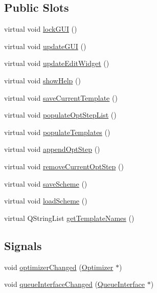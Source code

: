 \subsection*{Public Slots}
\begin{DoxyCompactItemize}
\item 
virtual void \hyperlink{classGlobalSearch_1_1AbstractEditTab_a450c63567ac48b329469b2c380ff46a4}{lock\+G\+U\+I} ()
\item 
virtual void \hyperlink{classGlobalSearch_1_1AbstractEditTab_ae34c4af22aa9a04eebc3a4a4a284da53}{update\+G\+U\+I} ()
\item 
virtual void \hyperlink{classGlobalSearch_1_1AbstractEditTab_a19292ce55de31e989deee2b166c188d1}{update\+Edit\+Widget} ()
\item 
virtual void \hyperlink{classGlobalSearch_1_1AbstractEditTab_a19d5d4e568a67e46cc6431ba8c4199d0}{show\+Help} ()
\item 
virtual void \hyperlink{classGlobalSearch_1_1AbstractEditTab_a27965a0c57832b480b6663e786950e7d}{save\+Current\+Template} ()
\item 
virtual void \hyperlink{classGlobalSearch_1_1AbstractEditTab_ac973d18ed4a3c2d4ed8392a1fc8bed10}{populate\+Opt\+Step\+List} ()
\item 
virtual void \hyperlink{classGlobalSearch_1_1AbstractEditTab_ae37c49f896c0d668d48ef9bcae90dcf7}{populate\+Templates} ()
\item 
virtual void \hyperlink{classGlobalSearch_1_1AbstractEditTab_ae86997d35f9d05458638766b4378b92d}{append\+Opt\+Step} ()
\item 
virtual void \hyperlink{classGlobalSearch_1_1AbstractEditTab_a5507b5aaa5021085a57d1be72b71d975}{remove\+Current\+Opt\+Step} ()
\item 
virtual void \hyperlink{classGlobalSearch_1_1AbstractEditTab_a5ff01d9316ca927b7cf75d7a6720a793}{save\+Scheme} ()
\item 
virtual void \hyperlink{classGlobalSearch_1_1AbstractEditTab_a0b0d6a412e3b73113a0e84f6a86c0a8c}{load\+Scheme} ()
\item 
virtual Q\+String\+List \hyperlink{classGlobalSearch_1_1AbstractEditTab_a78c72c6174761b4c95eb4d512042120c}{get\+Template\+Names} ()
\end{DoxyCompactItemize}
\subsection*{Signals}
\begin{DoxyCompactItemize}
\item 
void \hyperlink{classGlobalSearch_1_1AbstractEditTab_a439d2f12f3121c30adf8f3375b631dee}{optimizer\+Changed} (\hyperlink{classGlobalSearch_1_1Optimizer}{Optimizer} $\ast$)
\item 
void \hyperlink{classGlobalSearch_1_1AbstractEditTab_a069c8370545d5fbde59b7634ba6bb621}{queue\+Interface\+Changed} (\hyperlink{classGlobalSearch_1_1QueueInterface}{Queue\+Interface} $\ast$)
\end{DoxyCompactItemize}
